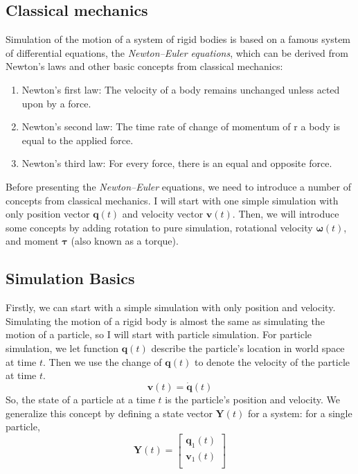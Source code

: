 \subsection{Classical mechanics}
Simulation of the motion of a system of rigid bodies is based on a famous system of differential equations, the \textit{Newton–Euler equations}, which can be derived from Newton’s laws and other basic concepts from classical mechanics:

\begin{enumerate}
    \item Newton’s first law: The velocity of a body remains unchanged unless acted upon by a force.
    \item Newton’s second law: The time rate of change of momentum of r a body is equal to the applied force.
    \item Newton’s third law: For every force, there is an equal and opposite force.
\end{enumerate}

Before presenting the \textit{Newton–Euler} equations, we need to introduce a number of concepts from classical mechanics. I will start with one simple simulation with only position vector $\pmb{q}(t)$ and velocity vector $\pmb{v}(t)$. Then, we will introduce some concepts by adding rotation to pure simulation, rotational velocity $\pmb{\omega}(t)$, and moment $\pmb{\tau}$ (also known as a torque).


\subsection{Simulation Basics}

Firstly, we can start with a simple simulation with only position and velocity. Simulating the motion of a rigid body is almost the same as simulating the motion of a particle, so I will start with particle simulation. For particle simulation, we let function $\pmb{q}(t)$ describe the particle's location in world space at time $t$. Then we use the change of $\pmb{q}(t)$
to denote the velocity of the particle at time $t$. 
\begin{equation}
    \pmb{v}(t) = \dot{\pmb{q}}(t)
\end{equation}
So, the state of a particle at a time $t$ is the particle's position and velocity. We generalize this concept by defining a state vector $\textbf{Y}(t)$ for a system: for a single particle,
\begin{equation}
    \textbf{Y}(t) = \left[
        \begin{array}{c}
            \pmb{q}_{1}(t) \\
            \pmb{v}_{1}(t) \\
        \end{array}
    \right]
\end{equation}

